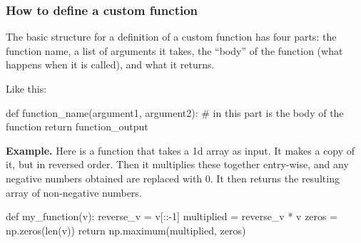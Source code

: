 \documentclass{beamer}
\newenvironment{codeblock}
    {\hfill\begin{beamerboxesrounded}[lower=codecol, width=0.8\textwidth]
    \medskip

    }
    { 
    \end{beamerboxesrounded}\hfill
    }
\theoremstyle{example}
\begin{document}
\begin{frame}[fragile]
    \frametitle{How to define a custom function}
The basic structure for a definition of a custom function has four parts: the function name, a list of arguments it takes, the ``body'' of the function (what happens when it is called), and what it returns.

Like this:

\begin{codeblock}

    \begin{python}
    def function_name(argument1, argument2):
        # in this part is the body of the function
        return function_output
    \end{python}
    
    \end{codeblock}
    

\textbf{Example.} Here is a function that takes a 1d array as input. It makes a copy of it, but in reversed order.  Then it multiplies these together entry-wise, and any negative numbers obtained are replaced with 0. It then returns the resulting array of non-negative numbers.

\begin{codeblock}

\begin{python}
def my_function(v):
    reverse_v = v[::-1]
    multiplied = reverse_v * v
    zeros = np.zeros(len(v))
    return np.maximum(multiplied, zeros)
\end{python}

\end{codeblock}

\end{frame}
\end{document}
